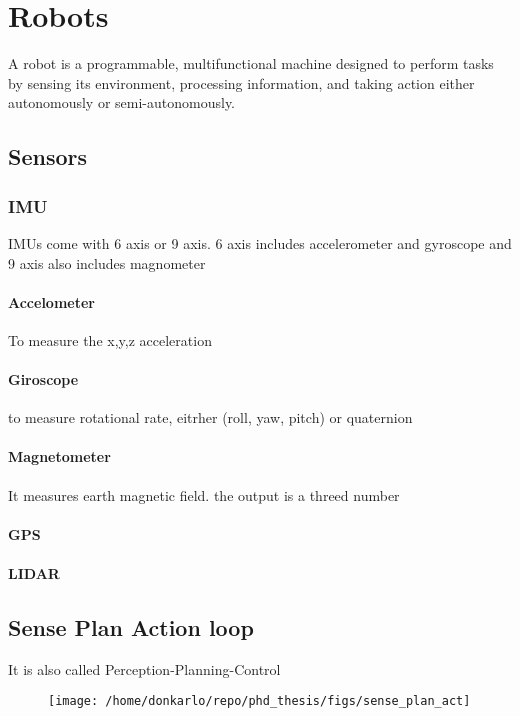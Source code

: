 \chapter{Robots}
A robot is a programmable, multifunctional machine designed to perform tasks by sensing its environment, processing information, and taking action either autonomously or semi-autonomously.



\section{Sensors}
    \subsection{IMU}
        IMUs come with 6 axis or 9 axis. 6 axis includes accelerometer and gyroscope and 9 axis also includes magnometer
        
        \subsubsection{Accelometer}
            To measure the x,y,z acceleration
        
        \subsubsection{Giroscope}
            to measure rotational rate, eitrher (roll, yaw, pitch) or quaternion
        
        \subsubsection{Magnetometer}
            It measures earth magnetic field. the output is a threed number
        
        \subsubsection{GPS}
        
        \subsubsection{LIDAR}
        
\section{Sense Plan Action loop}
    It is also called Perception-Planning-Control
    \begin{figure}[H]
        \centering
        \texttt{[image: /home/donkarlo/repo/phd\_thesis/figs/sense\_plan\_act]}
        \label{fig:my_png}
    \end{figure}
    
